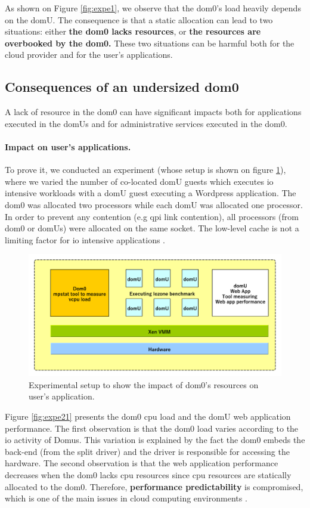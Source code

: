As shown on Figure \ref{fig:expe1}, we observe that the dom0's load heavily depends on the domU. The consequence is that a static allocation can lead to two situations: either \textbf{the dom0 lacks resources}, or \textbf{the resources are overbooked by the dom0.} These two situations can be harmful both for the cloud provider and for the user's applications.

\subsection{Consequences of an undersized dom0}
A lack of resource in the dom0 can have significant impacts both for applications executed in the domUs and for administrative services executed in the dom0. 

\paragraph{Impact on user's applications.} To prove it, we conducted an experiment (whose setup is shown on figure \ref{fig:expe2}), where we varied the number of co-located domU guests which executes \acrshort{io} intensive workloads with a domU guest executing a Wordpress application. The dom0 was allocated two processors while each domU was allocated one processor. In order to prevent any contention (e.g \acrshort{qpi} link contention), all processors (from dom0 or domUs) were allocated on the same socket. The low-level cache is not a limiting factor for \acrshort{io} intensive applications \citep{work03}.  

\begin{figure}[!h]
    \centering
    \includegraphics[scale=0.65]{fig03/expe2.pdf}
    \caption{Experimental setup to show the impact of dom0's resources on user's application.}
    \label{fig:expe2}
\end{figure}

Figure \ref{fig:expe21} presents the dom0 \acrshort{cpu} load and the domU web application performance. The first observation is that the dom0 load varies according to the \acrshort{io} activity of Domus. This variation is explained by the fact the dom0 embeds the back-end (from the split driver) and the driver is responsible for accessing the hardware. The second observation is that the web application performance decreases when the dom0 lacks \acrshort{cpu} resources since \acrshort{cpu} resources are statically allocated to the dom0. Therefore, \textbf{performance predictability} is compromised, which is one of the main issues in cloud computing environments \citep{predictability,predictability1,predictability2,predictability3,predictability4}.

